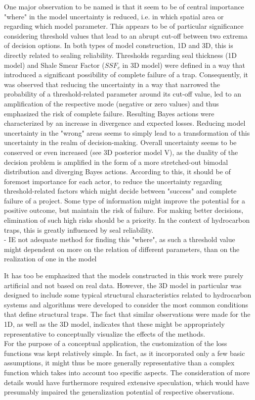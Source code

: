 	One major observation to be named is that it seem to be of central importance "where" in the model uncertainty is reduced, i.e. in which spatial area or regarding which model parameter. This appears to be of particular significance considering threshold values that lead to an abrupt cut-off between two extrema of decision options. In both types of model construction, 1D and 3D, this is directly related to sealing reliability. Thresholds regarding seal thickness (1D model) and Shale Smear Factor ($SSF_c$ in 3D model) were defined in a way that introduced a significant possibility of complete failure of a trap. Consequently, it was observed that reducing the uncertainty in a way that narrowed the probability of a threshold-related parameter around its cut-off value, led to an amplification of the respective mode (negative or zero values) and thus emphasized the risk of complete failure. Resulting Bayes actions were characterized by an increase in divergence and expected losses. Reducing model uncertainty in the "wrong" areas seems to simply lead to a transformation of this uncertainty in the realm of decision-making. Overall uncertainty seems to be conserved or even increased (see 3D posterior model V), as the duality of the decision problem is amplified in the form of a more stretched-out bimodal distribution and diverging Bayes actions. According to this, it should be of foremost importance for each actor, to reduce the uncertainty regarding threshold-related factors which might decide between "success" and complete failure of a project. Some type of information might improve the potential for a positive outcome, but maintain the risk of failure. For making better decisions, elimination of such high risks should be a priority. In the context of hydrocarbon traps, this is greatly influenced by seal reliability.\\
	
	- IE not adequate method for finding this "where", as such a threshold value might dependent on more on the relation of different parameters, than on the realization of one in the model
	
	It has too be emphasized that the models constructed in this work were purely artificial and not based on real data. However, the 3D model in particular was designed to include some typical structural characteristics related to hydrocarbon systems and algorithms were developed to consider the most common conditions that define structural traps. The fact that similar observations were made for the 1D, as well as the 3D model, indicates that these might be appropriately representative to conceptually visualize the effects of the methods.\\
	For the purpose of a conceptual application, the customization of the loss functions was kept relatively simple. In fact, as it incorporated only a few basic assumptions, it might thus be more generally representative than a complex function which takes into account too specific aspects. The consideration of more details would have furthermore required extensive speculation, which would have presumably impaired the generalization potential of respective observations.
	

